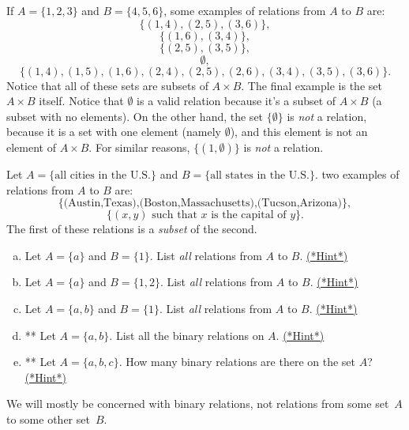 \begin{eg}\label{ex_rel}
If $A = \{1,2,3\}$ and $B = \{4,5,6\}$, some examples of relations from $A$ to $B$ are:
\[ \{ (1,4), (2,5), (3,6)\}, \]
\[ \{ (1,6), (3,4)\}, \]
\[ \{ (2,5), (3,5) \}, \]
\[ \emptyset, \]
\[ \{ (1,4), (1,5), (1,6), (2,4), (2,5), (2,6), (3,4), (3,5), (3,6) \}.\] 
Notice that all of these sets are subsets of $A \times B$. The final example is the set $A \times B$ itself. Notice that $\emptyset$ is a valid relation because it's a subset of $A \times B$ (a subset with no elements).  On the other hand, the set $\{ \emptyset \}$ is \emph{not} a relation, because it is  a set with one element (namely $\emptyset$), and this element is not an element of $A \times B$. For similar reasons, $\{(1, \emptyset) \}$ is \emph{not} a relation.
\end{eg}

\begin{eg}
Let $A = \{\text{all cities in the U.S.}\}$ and $B = \{\text{all states in the U.S.}\}$. two examples of relations from $A$ to $B$ are:
\[ \{ \text{(Austin,Texas),(Boston,Massachusetts),(Tucson,Arizona)}\}, \]
\[ \{ (x,y) \text{ such that } x \text{ is the capital of } y \}. \]
The first of these relations  is a \emph{subset} of the second.
\end{eg}


\begin{exercise}{7}
\begin{enumerate}[(a)]
\item
Let $A = \{a\}$ and $B = \{1\}$. List \emph{all} relations from $A$ to $B$.
\hyperref[secEqRelChapHints]{(*Hint*)}
\item
Let $A = \{a\}$ and $B = \{1,2\}$. List \emph{all} relations from $A$ to $B$.
\hyperref[secEqRelChapHints]{(*Hint*)}
\item
Let $A = \{a,b\}$ and $B = \{1\}$. List \emph{all} relations from $A$ to $B$.
\hyperref[secEqRelChapHints]{(*Hint*)}
\item
** Let $A = \{a,b\}$. List all the binary relations on $A$.
\hyperref[secEqRelChapHints]{(*Hint*)}
\item
** Let $A = \{a,b,c\}$. How many binary relations are there on the set $A$?
\hyperref[secEqRelChapHints]{(*Hint*)}
\end{enumerate}
\end{exercise}



We will mostly be concerned with binary relations, not relations from some set~$A$ to some other set~$B$.

